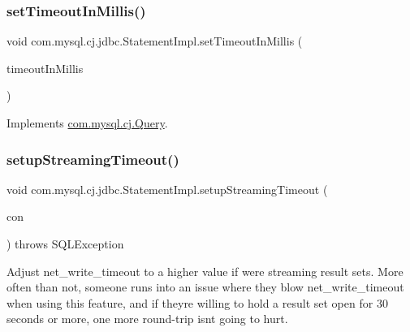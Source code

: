 \mbox{\label{classcom_1_1mysql_1_1cj_1_1jdbc_1_1_statement_impl_a88a77da140cb220313f9f876f08ee0a1}} 
\subsubsection{\texorpdfstring{set\+Timeout\+In\+Millis()}{setTimeoutInMillis()}}
{\footnotesize\ttfamily void com.\+mysql.\+cj.\+jdbc.\+Statement\+Impl.\+set\+Timeout\+In\+Millis (\begin{DoxyParamCaption}\item[{int}]{timeout\+In\+Millis }\end{DoxyParamCaption})}



Implements \mbox{\hyperlink{interfacecom_1_1mysql_1_1cj_1_1_query_a9bdb29806cdcfabc9bf48c9c7872d777}{com.\+mysql.\+cj.\+Query}}.

\mbox{\label{classcom_1_1mysql_1_1cj_1_1jdbc_1_1_statement_impl_a04f28c7dc2d7b2c20ae6fad4301dd8fc}} 
\subsubsection{\texorpdfstring{setup\+Streaming\+Timeout()}{setupStreamingTimeout()}}
{\footnotesize\ttfamily void com.\+mysql.\+cj.\+jdbc.\+Statement\+Impl.\+setup\+Streaming\+Timeout (\begin{DoxyParamCaption}\item[{\mbox{\hyperlink{interfacecom_1_1mysql_1_1cj_1_1jdbc_1_1_jdbc_connection}{Jdbc\+Connection}}}]{con }\end{DoxyParamCaption}) throws S\+Q\+L\+Exception\hspace{0.3cm}{\ttfamily [protected]}}

Adjust net\+\_\+write\+\_\+timeout to a higher value if we\textquotesingle{}re streaming result sets. More often than not, someone runs into an issue where they blow net\+\_\+write\+\_\+timeout when using this feature, and if they\textquotesingle{}re willing to hold a result set open for 30 seconds or more, one more round-\/trip isn\textquotesingle{}t going to hurt.

